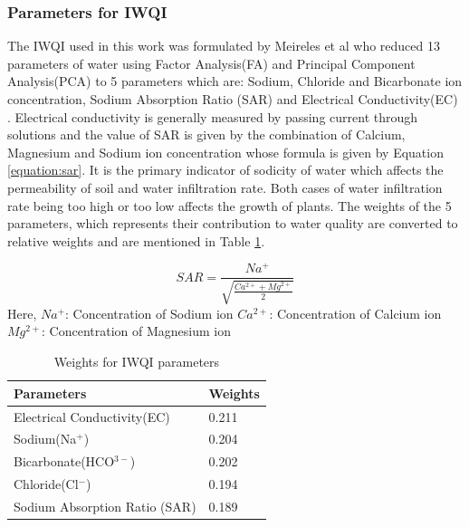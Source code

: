 \documentclass[conference]{IEEEtran}
\begin{document}
\subsubsection{Parameters for IWQI}
\label{subsubsection:WaterQualityParameters}
The IWQI used in this work was formulated by Meireles et al who reduced 13 parameters of water using Factor Analysis(FA) and Principal Component Analysis(PCA) to 5 parameters which are: Sodium, Chloride and Bicarbonate ion concentration, Sodium Absorption Ratio (SAR) and Electrical Conductivity(EC) \cite{article:irrigationWaterQuality}. Electrical conductivity is generally measured by passing current through solutions and the value of SAR is given by the combination of Calcium, Magnesium and Sodium ion concentration whose formula is given by Equation \ref{equation:sar}. It is the primary indicator of sodicity of water which affects the permeability of soil and water infiltration rate\cite{book:waterQualityAgri}. Both cases of water infiltration rate being too high or too low affects the growth of plants. The weights of the 5 parameters, which represents their contribution to water quality are converted to relative weights and are mentioned in Table \ref{table:wqiParams}.

\begin{equation}
\label{equation:sar}
    SAR = \frac{Na^+}{\sqrt{\frac{Ca^{2+} + Mg^{2+}}{2}}} 
\end{equation}
Here, \newline
$Na^+$: Concentration of Sodium ion \newline
$Ca^{2+}$: Concentration of Calcium ion \newline
$Mg^{2+}$: Concentration of Magnesium ion \newline

\begin{table}[h!]
    \centering
    \caption{Weights for IWQI parameters}
    \begin{tabular}{|l|l|}
    \hline
        \textbf{Parameters} & \textbf{Weights} \\ \hline
        Electrical Conductivity(EC) & 0.211 \\ \hline
        Sodium(Na$^+$) & 0.204 \\ \hline
        Bicarbonate(HCO$^{3-}$) & 0.202 \\ \hline
        Chloride(Cl$^-$) & 0.194 \\ \hline
        Sodium Absorption Ratio (SAR) & 0.189 \\ \hline
    \end{tabular}
    \label{table:wqiParams}
\end{table}
\end{document}
